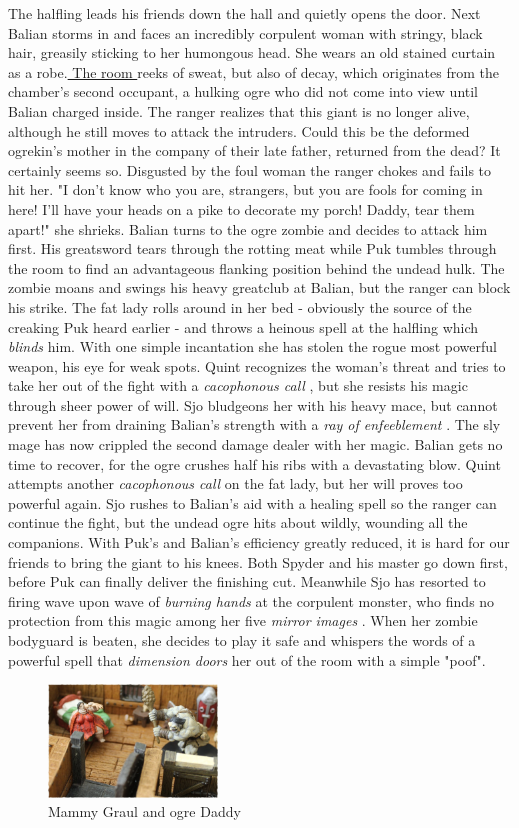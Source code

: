 The halfling leads his friends down the hall and quietly opens the door. Next Balian storms in and faces an incredibly corpulent woman with stringy, black hair, greasily sticking to her humongous head. She wears an old stained curtain as a robe.\hyperref[fig:Mammy-Graul-and-ogre-Daddy-507696824]{ The room } reeks of sweat, but also of decay, which originates from the chamber's second occupant, a hulking ogre who did not come into view until Balian charged inside. The ranger realizes that this giant is no longer alive, although he still moves to attack the intruders. Could this be the deformed ogrekin's mother in the company of their late father, returned from the dead? It certainly seems so. Disgusted by the foul woman the ranger chokes and fails to hit her. "I don't know who you are, strangers, but you are fools for coming in here! I'll have your heads on a pike to decorate my porch! Daddy, tear them apart!" she shrieks. Balian turns to the ogre zombie and decides to attack him first. His greatsword tears through the rotting meat while Puk tumbles through the room to find an advantageous flanking position behind the undead hulk. The zombie moans and swings his heavy greatclub at Balian, but the ranger can block his strike. The fat lady rolls around in her bed - obviously the source of the creaking Puk heard earlier - and throws a heinous spell at the halfling which  {\itshape blinds} him. With one simple incantation she has stolen the rogue most powerful weapon, his eye for weak spots. Quint recognizes the woman's threat and tries to take her out of the fight with a  {\itshape cacophonous call} , but she resists his magic through sheer power of will. Sjo bludgeons her with his heavy mace, but cannot prevent her from draining Balian's strength with a  {\itshape ray of enfeeblement} . The sly mage has now crippled the second damage dealer with her magic. Balian gets no time to recover, for the ogre crushes half his ribs with a devastating blow. Quint attempts another  {\itshape cacophonous call} on the fat lady, but her will proves too powerful again. Sjo rushes to Balian's aid with a healing spell so the ranger can continue the fight, but the undead ogre hits about wildly, wounding all the companions. With Puk's and Balian's efficiency greatly reduced, it is hard for our friends to bring the giant to his knees. Both Spyder and his master go down first, before Puk can finally deliver the finishing cut. Meanwhile Sjo has resorted to firing wave upon wave of  {\itshape burning hands} at the corpulent monster, who finds no protection from this magic among her five  {\itshape mirror images} . When her zombie bodyguard is beaten, she decides to play it safe and whispers the words of a powerful spell that  {\itshape dimension doors} her out of the room with a simple "poof". \\

\begin{figure}[h]
	\centering
	\includegraphics[width=0.4\textwidth]{images/Mammy-Graul-and-ogre-Daddy-507696824_mod.jpg}
	\caption{Mammy Graul and ogre Daddy}
	\label{fig:Mammy-Graul-and-ogre-Daddy-507696824}
\end{figure}

